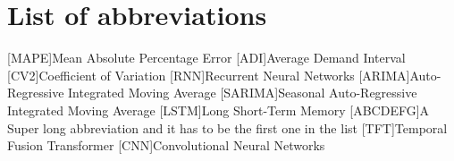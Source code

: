 
\somecommand

\somemorecommand

\blablabla

\blablabla

\chapter*{List of abbreviations}

\begin{acronym}[cv2]
    [MAPE]{Mean Absolute Percentage Error}
    [ADI]{Average Demand Interval}
    [CV2]{Coefficient of Variation}
    [RNN]{Recurrent Neural Networks}
    [ARIMA]{Auto-Regressive Integrated Moving Average}
    [SARIMA]{Seasonal Auto-Regressive Integrated Moving Average}
    [LSTM]{Long Short-Term Memory}
    [ABCDEFG]{A Super long abbreviation and it has to be the first one in the list}
    [TFT]{Temporal Fusion Transformer}
    [CNN]{Convolutional Neural Networks}
\end{acronym}


\blablabla

\newpage



\blablabla